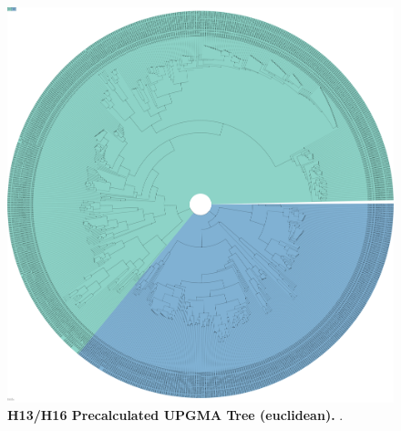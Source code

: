 \begin{figure}[!hbt]
    \centering
    \includegraphics[width=\dimexpr\textwidth-2\fboxsep-2\fboxrule,fbox]{UMAP/Precalculated_Segment_4_H_Euclidean.pdf}
    \caption[H13/H16 Precalculated \Acrshort{UPGMA} Tree (euclidean)]{\textbf{H13/H16 Precalculated \Acrshort{UPGMA} Tree (euclidean).} .}
    \label{fig:Precalculated_Euclid}
\end{figure}